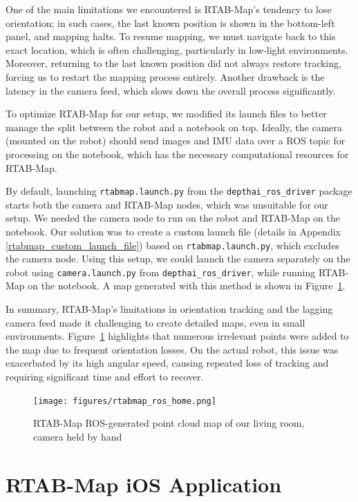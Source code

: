 One of the main limitations we encountered is RTAB-Map’s tendency to lose orientation; in such cases, the last known position is shown in the bottom-left panel, and mapping halts. To resume mapping, we must navigate back to this exact location, which is often challenging, particularly in low-light environments. Moreover, returning to the last known position did not always restore tracking, forcing us to restart the mapping process entirely. Another drawback is the latency in the camera feed, which slows down the overall process significantly.

To optimize RTAB-Map for our setup, we modified its launch files to better manage the split between the robot and a notebook on top. Ideally, the camera (mounted on the robot) should send images and IMU data over a ROS topic for processing on the notebook, which has the necessary computational resources for RTAB-Map.

By default, launching \verb|rtabmap.launch.py| from the \verb|depthai_ros_driver| package starts both the camera and RTAB-Map nodes, which was unsuitable for our setup. We needed the camera node to run on the robot and RTAB-Map on the notebook. Our solution was to create a custom launch file (details in Appendix \ref{rtabmap_custom_launch_file}) based on \verb|rtabmap.launch.py|, which excludes the camera node. Using this setup, we could launch the camera separately on the robot using \verb|camera.launch.py| from \verb|depthai_ros_driver|, while running RTAB-Map on the notebook. A map generated with this method is shown in Figure~\ref{fig:rtabmap_nokia}.

In summary, RTAB-Map’s limitations in orientation tracking and the lagging camera feed made it challenging to create detailed maps, even in small environments. Figure~\ref{fig:rtabmap_nokia} highlights that numerous irrelevant points were added to the map due to frequent orientation losses. On the actual robot, this issue was exacerbated by its high angular speed, causing repeated loss of tracking and requiring significant time and effort to recover.

\begin{figure}[htbp]
	\centering
	\texttt{[image: figures/rtabmap\_ros\_home.png]}
	\caption{RTAB-Map ROS-generated point cloud map of our living room, camera held by hand}
	\label{fig:rtabmap_nokia}
\end{figure}

\FloatBarrier
\section{RTAB-Map iOS Application}

